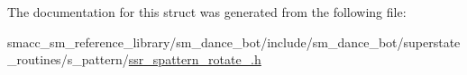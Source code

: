 The documentation for this struct was generated from the following file\+:\begin{DoxyCompactItemize}
\item 
smacc\+\_\+sm\+\_\+reference\+\_\+library/sm\+\_\+dance\+\_\+bot/include/sm\+\_\+dance\+\_\+bot/superstate\+\_\+routines/s\+\_\+pattern/\hyperlink{ssr__spattern__rotate__3_8h}{ssr\+\_\+spattern\+\_\+rotate\+\_.\+h}\end{DoxyCompactItemize}
